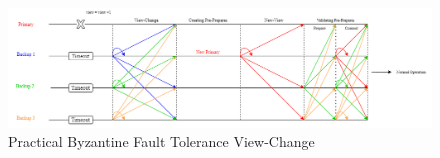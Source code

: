 \begin{figure}[!h]
	\centering
	\includegraphics[width=\linewidth]{figures/PBFTViewChange}
	\caption{Practical Byzantine Fault Tolerance View-Change}
	\label{fig:pbftviewchange}
\end{figure}


